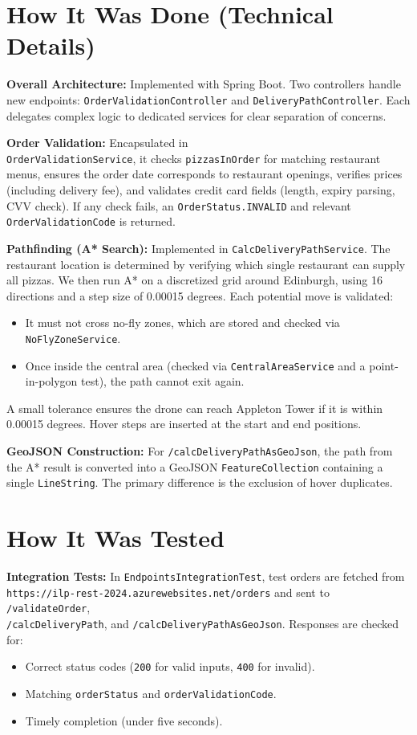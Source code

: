 \documentclass[12pt]{article}
\begin{document}
\section{How It Was Done (Technical Details)}
\textbf{Overall Architecture:} Implemented with Spring Boot. Two controllers handle new 
endpoints: \texttt{OrderValidationController} and \texttt{DeliveryPathController}. Each 
delegates complex logic to dedicated services for clear separation of concerns.

\textbf{Order Validation:} Encapsulated in \\\texttt{OrderValidationService}, it checks 
\texttt{pizzasInOrder} for matching restaurant menus, ensures the order date corresponds to 
restaurant openings, verifies prices (including delivery fee), and validates credit card 
fields (length, expiry parsing, CVV check). If any check fails, an \texttt{OrderStatus.INVALID} 
and relevant \texttt{OrderValidationCode} is returned.

\textbf{Pathfinding (A* Search):} Implemented in \texttt{CalcDeliveryPathService}. The 
restaurant location is determined by verifying which single restaurant can supply all pizzas. 
We then run A* on a discretized grid around Edinburgh, using 16 directions and a step size 
of 0.00015 degrees. Each potential move is validated:
\begin{itemize}
    \item It must not cross no-fly zones, which are stored and checked via \texttt{NoFlyZoneService}.
    \item Once inside the central area (checked via \texttt{CentralAreaService} and a point-in-polygon 
    test), the path cannot exit again.
\end{itemize}
A small tolerance ensures the drone can reach Appleton Tower if it is within 0.00015 degrees. 
Hover steps are inserted at the start and end positions.

\textbf{GeoJSON Construction:} For \texttt{/calcDeliveryPathAsGeoJson}, the path from the A* 
result is converted into a GeoJSON \texttt{FeatureCollection} containing a single 
\texttt{LineString}. The primary difference is the exclusion of hover duplicates.

\section{How It Was Tested}
\textbf{Integration Tests:} In \texttt{EndpointsIntegrationTest}, test orders are fetched from 
\\\texttt{https://ilp-rest-2024.azurewebsites.net/orders} and sent to 
\texttt{/validateOrder}, \\\texttt{/calcDeliveryPath}, and \texttt{/calcDeliveryPathAsGeoJson}. 
Responses are checked for:
\begin{itemize}
    \item Correct status codes (\texttt{200} for valid inputs, \texttt{400} for invalid).
    \item Matching \texttt{orderStatus} and \texttt{orderValidationCode}.
    \item Timely completion (under five seconds).
\end{itemize}
\end{document}
